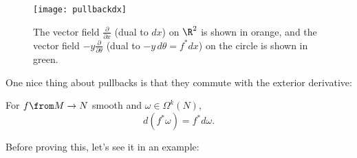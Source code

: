 \begin{example}
	\begin{figure}[htbp]
		\centering
			\texttt{[image: pullbackdx]}
		\caption{The vector field $\frac{\partial}{\partial x}$ (dual to $dx$) on $\R^2$ is shown in orange, and the vector field $-y \frac{\partial}{\partial \theta}$ (dual to $-y\, d\theta = f^\ast dx$) on the circle is shown in green.}
		\label{fig:pullback dx}
	\end{figure}
\end{example}

One nice thing about pullbacks is that they commute with the exterior derivative:

\begin{proposition}\label{prop:pullbacks commute with exterior derivative}
	For $f \from M \to N$ smooth and $\omega \in \Omega^k(N)$,
	\[
		d(f^\ast \omega) = f^\ast d\omega.
	\]
\end{proposition}

Before proving this, let's see it in an example:

